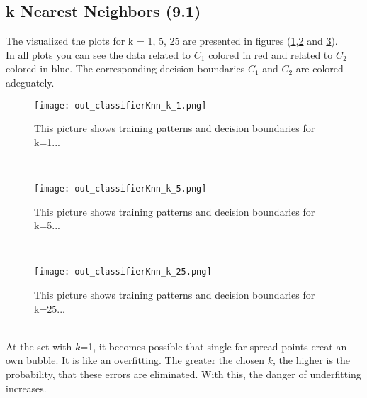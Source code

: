 \documentclass[a4paper,headings=small]{scrartcl}
\begin{document}
\subsection{k Nearest Neighbors (9.1)}
The visualized the plots for k = 1, 5, 25 are presented in figures (\ref{fig:out_classifierKnn_k_1},\ref{fig:out_classifierKnn_k_5} and \ref{fig:out_classifierKnn_k_25}).\\
In all plots you can see the data related to $C_1$ colored in red and related to $C_2$ colored in blue. The corresponding decision boundaries $C_1$ and $C_2$ are colored adeguately.
\begin{figure}[htbp]
\centering
\texttt{[image: out\_classifierKnn\_k\_1.png]}
\caption{This picture shows training patterns and decision boundaries for k=1...}
\label{fig:out_classifierKnn_k_1}
\end{figure}
\\
\begin{figure}[htbp]
\centering
\texttt{[image: out\_classifierKnn\_k\_5.png]}
\caption{This picture shows training patterns and decision boundaries for k=5...}
\label{fig:out_classifierKnn_k_5}
\end{figure}
\\
\begin{figure}[htbp]
\centering
\texttt{[image: out\_classifierKnn\_k\_25.png]}
\caption{This picture shows training patterns and decision boundaries for k=25...}
\label{fig:out_classifierKnn_k_25}
\end{figure}
\\
At the set with $k$=1, it becomes possible that single far spread points creat an own bubble. It is like an overfitting. The greater the chosen $k$, the higher is the probability, that these errors are eliminated. With this, the danger of underfitting increases.
\end{document}
